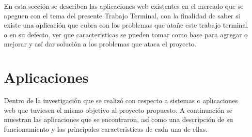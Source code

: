 \noindent En esta sección se describen las aplicaciones web existentes en el mercado que se apeguen con el tema del presente Trabajo Terminal, con la finalidad de saber si existe una aplicación que cubra con los problemas que atañe este trabajo terminal o en su defecto, ver que caracteristicas se pueden tomar como base para agregar o mejorar y así dar solución a los problemas que ataca el proyecto. 




\section{Aplicaciones}
\noindent Dentro de la investigación que se realizó con respecto a sistemas o aplicaciones web que tuviesen el mismo objetivo al proyecto propuesto. A continuación se muestran las aplicaciones que se encontraron, así como una descripción de su funcionamiento y las principales caracteristicas de cada una de ellas.
